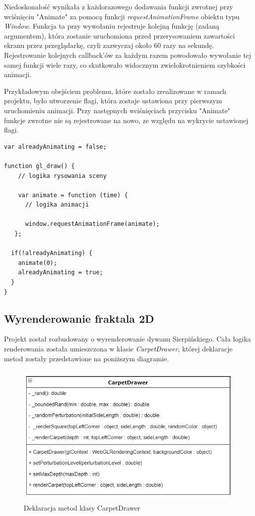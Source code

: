 \documentclass[a4paper,11pt]{article}
\begin{document}
Niedoskonałość wynikała z każdorazowego dodawania funkcji zwrotnej przy wciśnięciu "Animate" za pomocą funkcji \textit{requestAnimationFrame} obiektu typu \textit{Window}. Funkcja ta przy wywołaniu rejestruje kolejną funkcję (zadaną argumentem), która zostanie uruchomiona przed przerysowaniem zawartości ekranu przez przeglądarkę, czyli zazwyczaj około 60 razy na sekundę.  Rejestrowanie kolejnych callback'ów za każdym razem powodowało wywołanie tej samej funkcji wiele razy, co skutkowało widocznym zwielokrotnieniem szybkości animacji.

Przykładowym obejściem problemu, które zostało zrealizowane w ramach projektu, było utworzenie flagi, która zostaje ustawiona przy pierwszym uruchomieniu animacji. Przy następnych wciśnięciach przycisku "Animate" funkcje zwrotne nie są rejestrowane na nowo, ze względu na wykrycie ustawionej flagi.


\begin{lstlisting}[caption=Realizacja obejścia problemu przyśpieszania animacji]
var alreadyAnimating = false;

function gl_draw() {
    // logika rysowania sceny 

    var animate = function (time) {
      // logika animacji

      window.requestAnimationFrame(animate);
   };

  if(!alreadyAnimating) {
    animate(0);
    alreadyAnimating = true;
  }
}
\end{lstlisting}


\subsection{Wyrenderowanie fraktala 2D}

Projekt został rozbudowany o wyrenderowanie dywanu Sierpińskiego. Cała logika renderowania została umieszczona w klasie \textit{CarpetDrawer}, której deklaracje metod zostały przedstawione na poniższym diagramie.

\begin{figure}[H]
\centering
 \includegraphics[height=7cm]{uml.PNG}
\caption{Deklaracja metod klasy CarpetDrawer}
\end{figure}
\end{document}
